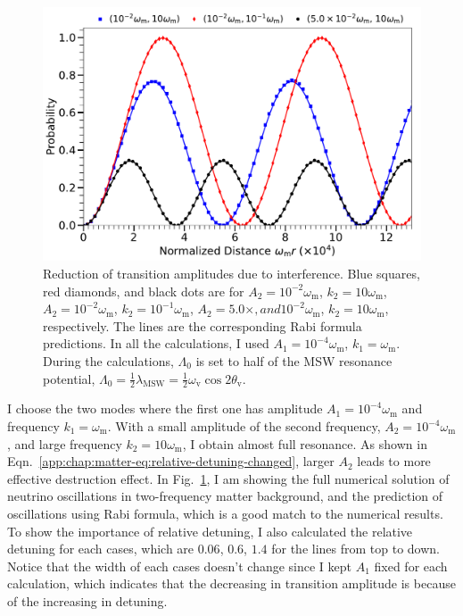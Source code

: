 \begin{figure}[!htbp]
                \centering
                \includegraphics[width=\columnwidth]{chapters/assets/matter/interference-reduction-slide-with-legend}
                \caption{Reduction of transition amplitudes due to interference. Blue squares, red diamonds, and black dots are for $A_2=10^{-2}\omega_{\mathrm{m}}$, $k_2=10\omega_{\mathrm m}$, $A_2=10^{-2}\omega_{\mathrm{m}}$, $k_2=10^{-1}\omega_{\mathrm m}$, $A_2=5.0\times, and 10^{-2}\omega_{\mathrm{m}}$, $k_2=10\omega_{\mathrm m}$, respectively. The lines are the corresponding Rabi formula predictions. In all the calculations, I used $A_1=10^{-4}\omega_{\mathrm m}$, $k_1=\omega_{\mathrm m}$. During the calculations, $\Lambda_0$ is set to half of the MSW resonance potential, $\Lambda_0 = \frac{1}{2}\lambda_{\mathrm{MSW}}=\frac{1}{2}\omega_{\mathrm{v}}\cos 2\theta_{\mathrm v}$.}
                \label{fig-rabi-oscillations-energy-gap-change}
\end{figure}


I choose the two modes where the first one has amplitude $A_1 = 10^{-4}\omega_{\mathrm{m}}$ and frequency $k_1 = \omega_{\mathrm{m}}$. With a small amplitude of the second frequency, $A_2=10^{-4}\omega_{\mathrm{m}}$, and large frequency $k_2=10\omega_{\mathrm{m}}$, I obtain almost full resonance. As shown in Eqn.~\ref{app:chap:matter-eq:relative-detuning-changed}, larger $A_2$ leads to more effective destruction effect. In Fig.~\ref{fig-rabi-oscillations-energy-gap-change}, I am showing the full numerical solution of neutrino oscillations in two-frequency matter background, and the prediction of oscillations using Rabi formula, which is a good match to the numerical results. To show the importance of relative detuning, I also calculated the relative detuning for each cases, which are $0.06$, $0.6$, $1.4$ for the lines from top to down. Notice that the width of each cases doesn't change since I kept $A_1$ fixed for each calculation, which indicates that the decreasing in transition amplitude is because of the increasing in detuning.


